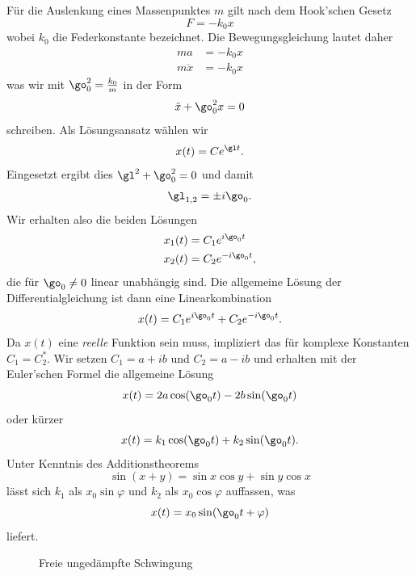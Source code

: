 \documentclass[%
draft,
11pt,%
twoside,%
titlepage,%
german,%
headsepline%
]{scrartcl}
\begin{document}
F\"ur
die Auslenkung eines Massenpunktes $m$ gilt nach dem Hook'schen Gesetz
$$F=-k_0x$$
wobei $k_0$ die Federkonstante bezeichnet. Die Bewegungsgleichung lautet daher
\begin{align*}
ma &= -k_0x\\
m\ddot{x} &= -k_0x
\end{align*}
was wir mit $\go_0^2=\frac{k_0}{m}$ in der Form
$$\ddot{x}+\go_0^2 x=0$$
schreiben. Als L\"osungsansatz w\"ahlen wir
$$x(t)=Ce^{\gl t}.$$
Eingesetzt ergibt dies $\gl^2+\go_0^2=0$ und damit
$$\gl_{1,2}=\pm i\go_0.$$
Wir erhalten also die beiden L\"osungen
\begin{align*}
x_1(t) &= C_1e^{i\go_0 t}\\
x_2(t) &= C_2e^{-i\go_0 t},
\end{align*}
die f\"ur $\go_0\neq0$ linear unabh\"angig sind. Die allgemeine L\"osung der Differentialgleichung ist dann eine Linearkombination
$$x(t)=C_1e^{i\go_0 t}+ C_2e^{-i\go_0 t}.$$
Da $x(t)$ eine \emph{reelle} Funktion sein muss, impliziert das f\"ur komplexe Konstanten $C_1=C_2^*$. Wir setzen $C_1=a+ib$ und $C_2=a-ib$ und erhalten mit der Euler'schen Formel die allgemeine L\"osung
$$x(t)=2a\cos(\go_0 t)-2b\sin(\go_0 t)$$
oder k\"urzer
$$x(t)=k_1\cos(\go_0 t)+k_2\sin(\go_0 t).$$
Unter Kenntnis des Additionstheorems
$$\sin(x+y)=\sin x\cos y+\sin y\cos x$$
l\"asst sich $k_1$ als $x_0\sin\varphi$ und $k_2$ als $x_0\cos\varphi$ auffassen, was
$$x(t)=x_0\sin(\go_0 t+\varphi)$$
liefert.

\begin{figure}
\begin{center}
\end{center}
\caption{Freie un\-ge\-d\"ampf\-te Schwingung}
\end{figure}
\end{document}

